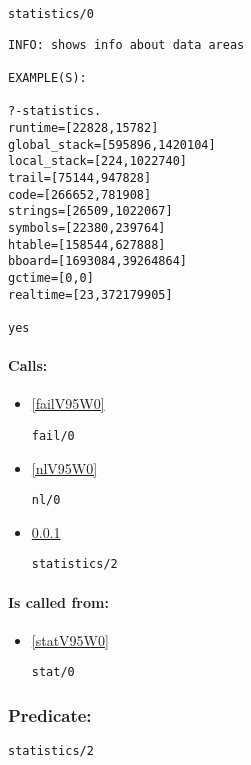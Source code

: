 \begin{verbatim}
statistics/0
\end{verbatim}

{\small \begin{verbatim}
INFO: shows info about data areas

EXAMPLE(S):

?-statistics.
runtime=[22828,15782]
global_stack=[595896,1420104]
local_stack=[224,1022740]
trail=[75144,947828]
code=[266652,781908]
strings=[26509,1022067]
symbols=[22380,239764]
htable=[158544,627888]
bboard=[1693084,39264864]
gctime=[0,0]
realtime=[23,372179905]

yes

\end{verbatim}}
\paragraph{Calls:} 
\begin{itemize}
\item \ref{failV95W0} 
\begin{verbatim}
fail/0
\end{verbatim}

\item \ref{nlV95W0} 
\begin{verbatim}
nl/0
\end{verbatim}

\item \ref{statisticsV95W2} 
\begin{verbatim}
statistics/2
\end{verbatim}

\end{itemize}
\paragraph{Is called from:} 
\begin{itemize}
\item \ref{statV95W0} 
\begin{verbatim}
stat/0
\end{verbatim}

\end{itemize}

\subsubsection{Predicate:} \label{statisticsV95W2}

\begin{verbatim}
statistics/2
\end{verbatim}

